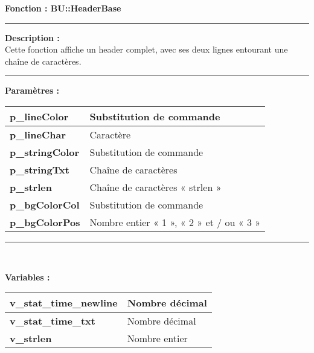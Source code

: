 \documentclass[a4paper,10pt]{article}
\begin{document}
\textbf{Fonction : \color{mauve}BU::HeaderBase}\\

\par\noindent\rule{\textwidth}{0.4pt}

\begin{justify}
    \textbf{Description :}\\[1\baselineskip]
    Cette fonction affiche un header complet, avec ses deux lignes entourant une chaîne de caractères.
\end{justify}

\par\noindent\rule{\textwidth}{0.4pt}

\begin{justify}
    \textbf{Paramètres :}

    \begin{tabular}{|l|l|}
        \hline
        \textbf{\color{orange}p\_lineColor} & Substitution de commande\\ 
        \hline
        \textbf{\color{orange}p\_lineChar} & Caractère\\ 
        \hline
        \textbf{\color{orange}p\_stringColor} & Substitution de commande\\ 
        \hline
        \textbf{\color{orange}p\_stringTxt} & Chaîne de caractères\\ 
        \hline
        \textbf{\color{orange}p\_strlen} & Chaîne de caractères « strlen »\\
        \hline
        \textbf{\color{orange}p\_bgColorCol} & Substitution de commande\\
        \hline
        \textbf{\color{orange}p\_bgColorPos} & Nombre entier « 1 », « 2 » et / ou « 3 »\\
        \hline
    \end{tabular}
\end{justify}

\par\noindent\rule{\textwidth}{0.4pt}\\

\begin{justify}
    \textbf{Variables :}\\[1\baselineskip]
    \begin{tabular}{|l|l|}
        \hline
        \textbf{\color{orange}v\_stat\_time\_newline} & Nombre décimal\\
        \hline
        \textbf{\color{orange}v\_stat\_time\_txt} & Nombre décimal\\
        \hline
        \textbf{\color{orange}v\_strlen} & Nombre entier\\
        \hline
    \end{tabular}
\end{justify}
\end{document}
